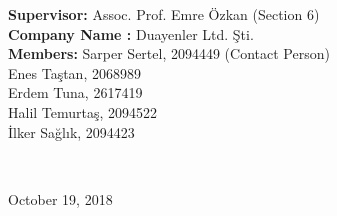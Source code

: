 \begin{titlepage}
\begin{minipage}{\textwidth}
\begin{flushleft}
	\large{\textbf{Supervisor\hspace{1.55cm}:}}
	Assoc. Prof. Emre Özkan (Section 6)\\
	\large{\textbf{Company Name :}}
	Duayenler Ltd. Şti.\\
	\large{\textbf{Members\hspace{1.89cm}:}}
	Sarper Sertel, 2094449 (Contact Person) \\\hspace{4.39cm} Enes Taştan, 2068989 \\\hspace{4.39cm} Erdem Tuna, 2617419 \\\hspace{4.39cm} Halil Temurtaş, 2094522 \\\hspace{4.39cm} İlker Sağlık, 2094423   \\

\end{flushleft}
\end{minipage}\\[1cm]



\begin{flushbottom}
{\large October 19, 2018}\\[1cm] %
	
\end{flushbottom}




\end{titlepage}


\blankpage



\tableofcontents
\newpage




